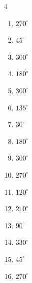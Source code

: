 \begin{multicols}{4}
\begin{enumerate}
  \item $\displaystyle 270^{\circ}$

  \item $\displaystyle 45^{\circ}$

  \item $\displaystyle 300^{\circ}$

  \item $\displaystyle 180^{\circ}$
        \phantom{$\displaystyle =\pi$}

  \item $\displaystyle 300^{\circ}$

  \item $\displaystyle 135^{\circ}$

  \item $\displaystyle 30^{\circ}$

  \item $\displaystyle 180^{\circ}$
        \phantom{$\displaystyle =\pi$}

  \item $\displaystyle 300^{\circ}$

  \item $\displaystyle 270^{\circ}$

  \item $\displaystyle 120^{\circ}$

  \item $\displaystyle 210^{\circ}$

  \item $\displaystyle 90^{\circ}$

  \item $\displaystyle 330^{\circ}$

  \item $\displaystyle 45^{\circ}$

  \item $\displaystyle 270^{\circ}$


\end{enumerate}
\end{multicols}
